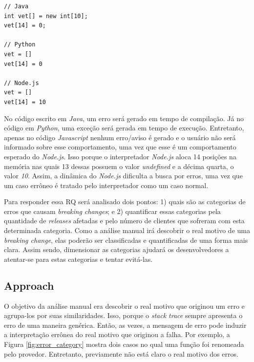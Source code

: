 \begin{lstlisting}[style=javascript, label=cod:wrong:access, caption={Acesso inválido à posição de memória}, numbers=none]
// Java
int vet[] = new int[10];
vet[14] = 0;

// Python
vet = []
vet[14] = 0

// Node.js
vet = []
vet[14] = 10
\end{lstlisting}

No código escrito em \textit{Java}, um erro será gerado em tempo de compilação. Já no código em \textit{Python}, uma exceção será gerada em tempo de execução. Entretanto, apenas no código \textit{Javascript} nenhum erro/aviso é gerado e o usuário não será informado sobre esse comportamento, uma vez que esse é um comportamento esperado do \textit{Node.js}. Isso porque o interpretador \textit{Node.js} aloca 14 posições na memória nas quais 13 dessas possuem o valor \textit{undefined} e a décima quarta, o valor \textit{10}. Assim, a dinâmica do \textit{Node.js} dificulta a busca por erros, uma vez que um caso errôneo é tratado pelo interpretador como um caso normal.


Para responder essa RQ será analisado dois pontos: 1) quais são as categorias de erros que causam \textit{breaking changes}; e 2) quantificar essas categorias pela quantidade de \textit{releases} afetadas e pelo número de clientes que sofreram com esta determinada categoria. Como a análise manual irá descobrir o real motivo de uma \textit{breaking change}, elas poderão ser classificadas e quantificadas de uma forma mais clara. Assim sendo, dimensionar as categorias ajudará os desenvolvedores a atentar-se para estas categorias e tentar evitá-las.

\subsection{Approach}
\label{apr:rq2}

O objetivo da análise manual era descobrir o real motivo que originou um erro e agrupa-los por suas similaridades. Isso, porque o \textit{stack trace} sempre apresenta o erro de uma maneira genérica. Então, as vezes, a mensagem de erro pode induzir a interpretação errônea do real motivo que originou a falha. Por exemplo, a Figura \ref{fig:error_category} mostra dois casos no qual uma função foi renomeada pelo provedor. Entretanto, previamente não está claro o real motivo dos erros.


